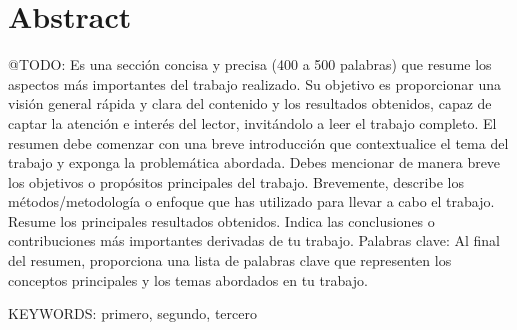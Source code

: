 \newpage
\section*{Abstract}
\colorbox{color_highlight}{@TODO:}
Es una sección concisa y precisa (400 a 500 palabras) que resume los aspectos más importantes del trabajo
realizado.
Su objetivo es proporcionar una visión general rápida y clara del contenido y los resultados obtenidos,
capaz de captar la atención e interés del lector, invitándolo a leer el trabajo completo.
El resumen debe comenzar con una breve introducción que contextualice el tema del trabajo y exponga la problemática
abordada.
Debes mencionar de manera breve los objetivos o propósitos principales del trabajo.
Brevemente, describe los métodos/metodología o enfoque que has utilizado para llevar a cabo el trabajo.
Resume los principales resultados
obtenidos.
Indica las conclusiones o contribuciones más importantes derivadas de tu trabajo.
Palabras clave: Al final del resumen, proporciona una lista de palabras clave que representen los conceptos
principales y los temas abordados en tu trabajo.

\vspace{0.5cm}
KEYWORDS: primero, segundo, tercero